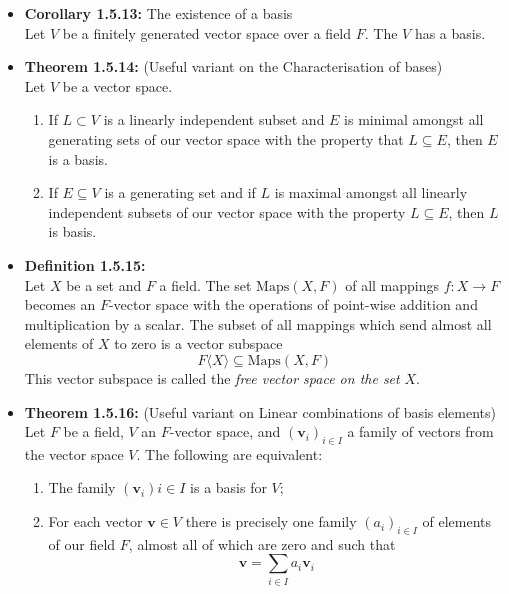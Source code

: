 \documentclass[11pt,a4paper]{article}
\begin{document}
\begin{itemize}
    \item \textbf{Corollary 1.5.13:} The existence of a basis \\
        Let $V$ be a finitely generated vector space over a field $F$.  The $V$ has a basis.

    \item \textbf{Theorem 1.5.14:} (Useful variant on the Characterisation of bases) \\
        Let $V$ be a vector space.
        \begin{enumerate}
            \item If $L \subset V$ is a linearly independent subset and $E$ is minimal
                amongst all generating sets of our vector space with the property that
                $L \subseteq E$, then $E$ is a basis.
            \item If $E \subseteq V$ is a generating set and if $L$ is maximal amongst all
                linearly independent subsets of our vector space with the property
                $L \subseteq E$, then $L$ is  basis.
        \end{enumerate}

    \item \textbf{Definition 1.5.15:} \\
        Let $X$ be a set and $F$ a field.
        The set $\text{Maps}(X,F)$ of all mappings $f : X \to F$ becomes an $F$-vector space
        with the operations of point-wise addition and multiplication by a scalar.
        The subset of all mappings which send almost all elements of
        $X$ to zero is a vector subspace
        \[
            F \langle X \rangle \subseteq \text{Maps}(X,F)
        \]
        This vector subspace is called the \emph{free vector space on the set} $X$.

    \item \textbf{Theorem 1.5.16:} (Useful variant on Linear combinations of basis elements) \\
        Let $F$ be a field, $V$ an $F$-vector space, and ${(\textbf{v}_i)}_{i\in I}$
        a family of vectors from the vector space $V$.
        The following are equivalent:
        \begin{enumerate}
            \item The family $(\textbf{v}_i){i\in I}$ is a basis for $V$;
            \item For each vector $\textbf{v} \in V$ there is precisely one family
                ${(a_i)}_{i \in I}$ of elements of our field $F$,
                almost all of which are zero and such that
                \[
                    \textbf{v} = \sum_{i \in I} a_i \textbf{v}_i
                \]
        \end{enumerate}
\end{itemize}
\end{document}
